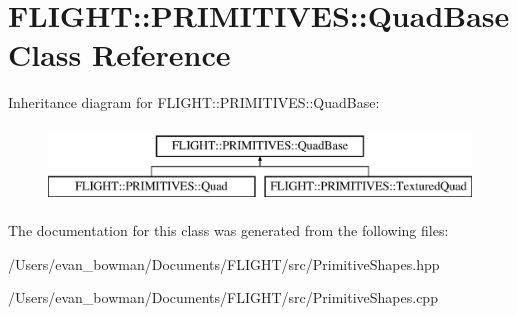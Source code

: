 \hypertarget{class_f_l_i_g_h_t_1_1_p_r_i_m_i_t_i_v_e_s_1_1_quad_base}{}\section{F\+L\+I\+G\+HT\+:\+:P\+R\+I\+M\+I\+T\+I\+V\+ES\+:\+:Quad\+Base Class Reference}
\label{class_f_l_i_g_h_t_1_1_p_r_i_m_i_t_i_v_e_s_1_1_quad_base}
Inheritance diagram for F\+L\+I\+G\+HT\+:\+:P\+R\+I\+M\+I\+T\+I\+V\+ES\+:\+:Quad\+Base\+:\begin{figure}[H]
\begin{center}
\leavevmode
\includegraphics[height=2.000000cm]{class_f_l_i_g_h_t_1_1_p_r_i_m_i_t_i_v_e_s_1_1_quad_base}
\end{center}
\end{figure}


The documentation for this class was generated from the following files\+:\begin{DoxyCompactItemize}
\item 
/\+Users/evan\+\_\+bowman/\+Documents/\+F\+L\+I\+G\+H\+T/src/Primitive\+Shapes.\+hpp\item 
/\+Users/evan\+\_\+bowman/\+Documents/\+F\+L\+I\+G\+H\+T/src/Primitive\+Shapes.\+cpp\end{DoxyCompactItemize}

